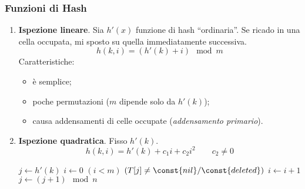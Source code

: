 \subsubsection{Funzioni di Hash}
\begin{enumerate}
    \item \textbf{Ispezione lineare}. Sia $h'(x)$ funzione di hash ``ordinaria''. Se 
        ricado in una cella occupata, mi sposto su quella immediatamente successiva.
        $$h(k,i) = (h'(k)+i) \mod m$$
        Caratteristiche:
        \begin{itemize}
            \item è semplice;
            \item poche permutazioni ($m$ dipende solo da $h'(k)$);
            \item causa addensamenti di celle occupate (\emph{addensamento primario}).
        \end{itemize}
    \item \textbf{Ispezione quadratica}. Fisso $h'(k)$.
    $$h(k,i) = h'(k) + c_1i + c_2i^2 \qquad c_2 \neq 0$$

    \begin{codebox}
        \zi $j \gets h'(k)$
        \zi $i \gets 0$
        \zi \While $(i < m)$  $(T[j] \neq \const{nil}/\const{deleted})$
        \zi \Do
                $i \gets i + 1$
        \zi     $j \gets (j + 1) \mod n$
            \End
    \end{codebox}


\end{enumerate}
